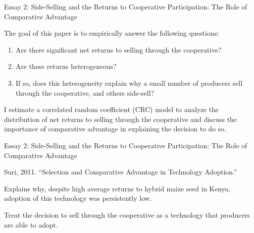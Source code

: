 \documentclass[aspectratio=169]{beamer}
\newenvironment{wideitemize}{\itemize\addtolength{\itemsep}{10pt}}{\enditemize}
\begin{document}
\begin{frame}{Essay 2: Side-Selling and the Returns to Cooperative Participation: The Role of Comparative Advantage}
    \begin{wideitemize}
        \item The goal of this paper is to empirically answer the following questions: \vspace{.25cm}
            \begin{enumerate}
                \item Are there significant net returns to selling through the cooperative? \vspace{.25cm}
                \item Are these returns heterogeneous? \vspace{.25cm}
                \item If so, does this heterogeneity explain why a small number of producers sell through the cooperative, and others side-sell? 
            \end{enumerate}
        \item I estimate a correlated random coefficient (CRC) model to analyze the distribution of net returns to selling through the cooperative and discuss the importance of comparative advantage in explaining the decision to do so.     
    \end{wideitemize}
\end{frame}

\begin{frame}{Essay 2: Side-Selling and the Returns to Cooperative Participation: The Role of Comparative Advantage}
    \begin{wideitemize}
        \item Suri, 2011. ``Selection and Comparative Advantage in Technology Adoption.''
 \vspace{.25cm}
            \begin{wideitemize}
                \item Explains why, despite high average returns to hybrid maize seed in Kenya, adoption of this technology was persistently low.
            \end{wideitemize}
        \item Treat the decision to sell through the cooperative as a technology that producers are able to adopt.
    \end{wideitemize}
\end{frame}
\end{document}
